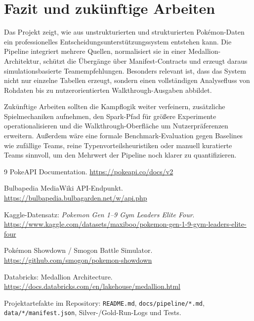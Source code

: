 \documentclass[sigconf,nonacm]{acmart}
\begin{document}
\section{Fazit und zukünftige Arbeiten}
Das Projekt zeigt, wie aus unstrukturierten und strukturierten Pokémon-Daten ein professionelles Entscheidungsunterstützungssystem entstehen kann. Die Pipeline integriert mehrere Quellen, normalisiert sie in einer Medallion-Architektur, schützt die Übergänge über Manifest-Contracts und erzeugt daraus simulationsbasierte Teamempfehlungen. Besonders relevant ist, dass das System nicht nur einzelne Tabellen erzeugt, sondern einen vollständigen Analysefluss von Rohdaten bis zu nutzerorientierten Walkthrough-Ausgaben abbildet.

Zukünftige Arbeiten sollten die Kampflogik weiter verfeinern, zusätzliche Spielmechaniken aufnehmen, den Spark-Pfad für größere Experimente operationalisieren und die Walkthrough-Oberfläche um Nutzerpräferenzen erweitern. Außerdem wäre eine formale Benchmark-Evaluation gegen Baselines wie zufällige Teams, reine Typenvorteilsheuristiken oder manuell kuratierte Teams sinnvoll, um den Mehrwert der Pipeline noch klarer zu quantifizieren.

\balance
\begin{thebibliography}{9}
PokeAPI Documentation. \url{https://pokeapi.co/docs/v2}

Bulbapedia MediaWiki API-Endpunkt. \url{https://bulbapedia.bulbagarden.net/w/api.php}

Kaggle-Datensatz: \emph{Pokemon Gen 1--9 Gym Leaders Elite Four}. \url{https://www.kaggle.com/datasets/maxiboo/pokemon-gen-1-9-gym-leaders-elite-four}

Pokémon Showdown / Smogon Battle Simulator. \url{https://github.com/smogon/pokemon-showdown}

Databricks: Medallion Architecture. \url{https://docs.databricks.com/en/lakehouse/medallion.html}

Projektartefakte im Repository: \texttt{README.md}, \texttt{docs/pipeline/*.md}, \texttt{data/*/manifest.json}, Silver-/Gold-Run-Logs und Tests.
\end{thebibliography}
\end{document}
